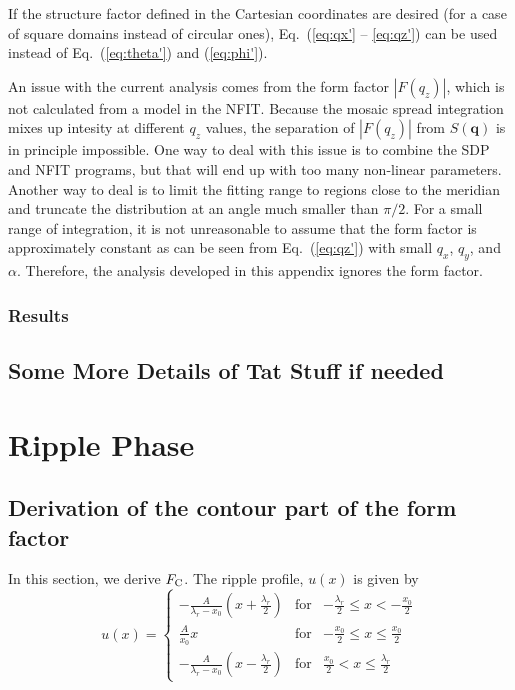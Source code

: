 If the structure factor defined in the Cartesian coordinates are desired
(for a case of square domains instead of circular ones),
Eq.~(\ref{eq:qx'} -- \ref{eq:qz'}) can be used instead of 
Eq.~(\ref{eq:theta'}) and (\ref{eq:phi'}).

An issue with the current analysis comes from the form factor $|F(q_z)|$,
which is not calculated from a model in the NFIT. Because the mosaic
spread integration mixes up intesity at different $q_z$ values, 
the separation of $|F(q_z)|$ from $S(\mathbf{q})$ is in principle impossible. 
One way to deal with this issue is to combine the SDP and NFIT programs, but
that will end up with too many non-linear parameters.
Another way to deal is to limit the fitting range to regions close to the meridian
and truncate the distribution at an angle much smaller than $\pi/2$. 
For a small range of integration, it is not unreasonable to assume that
the form factor is approximately constant as can be seen from 
Eq.~(\ref{eq:qz'}) with small $q_x$, $q_y$, and $\alpha$. 
Therefore, the analysis developed in this appendix ignores the form factor.

\subsection{Results}

\section{Some More Details of Tat Stuff if needed}

\chapter{Ripple Phase}
\section{Derivation of the contour part of the form factor}
In this section, we derive $F_\mathrm{C}$. The ripple profile, $u(x)$ is given by
\begin{equation}
  u(x) = \left\{
    \begin{array}{ccc}
    -\frac{A}{\lambda_r-x_0}\left(x+\frac{\lambda_r}{2}\right) 
      & \text{for} 
      & -\frac{\lambda_r}{2} \leq x < -\frac{x_0}{2} \\
    \frac{A}{x_0}x 
      & \text{for} 
      & -\frac{x_0}{2} \leq x \leq \frac{x_0}{2} \\
    -\frac{A}{\lambda_r-x_0} \left(x-\frac{\lambda_r}{2}\right)
      & \text{for} 
      & \frac{x_0}{2} < x \leq \frac{\lambda_r}{2}
    \end{array} \right.
\end{equation}

